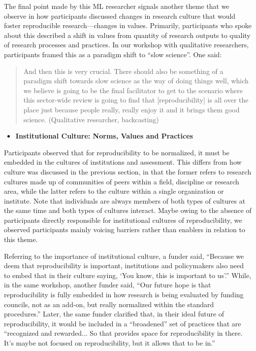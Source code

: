 \documentclass[authordate, meta]{jote-new-article}
\begin{document}
	The final point made by this ML researcher signals another theme that we observe in how participants discussed changes in research culture that would foster reproducible research—changes in values. Primarily, participants who spoke about this described a shift in values from quantity of research outputs to quality of research processes and practices. In our workshop with qualitative researchers, participants framed this as a paradigm shift to “slow science”. One said:


\begin{quote}
	And then this is very crucial. There should also be something of a paradigm shift towards slow science as the way of doing things well, which we believe is going to be the final facilitator to get to the scenario where this sector-wide review is going to find that [reproducibility] is all over the place just because people really, really enjoy it and it brings them good science. (Qualitative researcher, backcasting)
\end{quote}
	


\begin{itemize}[after=\vspace{-\baselineskip}]
	\item \textbf{Institutional Culture: Norms, Values and Practices}
\end{itemize}



	\noindent Participants observed that for reproducibility to be normalized, it must be embedded in the cultures of institutions and assessment. This differs from how culture was discussed in the previous section, in that the former refers to research cultures made up of communities of peers within a field, discipline or research area, while the latter refers to the culture within a single organization or institute. Note that individuals are always members of both types of cultures at the same time and both types of cultures interact. Maybe owing to the absence of participants directly responsible for institutional cultures of reproducibility, we observed participants mainly voicing barriers rather than enablers in relation to this theme.









	Referring to the importance of institutional culture, a funder said, “Because we deem that reproducibility is important, institutions and policymakers also need to embed that in their culture saying, ‘You know, this is important to us'.” While, in the same workshop, another funder said, “Our future hope is that reproducibility is fully embedded in how research is being evaluated by funding councils, not as an add-on, but really normalized within the standard procedures.” Later, the same funder clarified that, in their ideal future of reproducibility, it would be included in a “broadened” set of practices that are “recognized and rewarded... So that provides space for reproducibility in there. It's maybe not focused on reproducibility, but it allows that to be in.”
\end{document}
